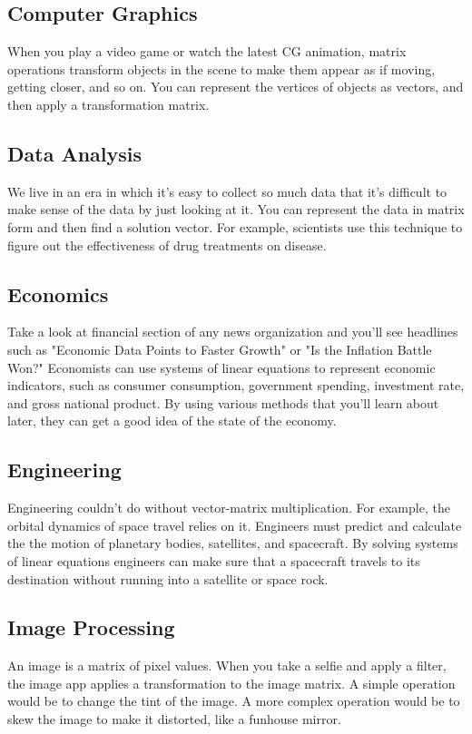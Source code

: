 \subsection{Computer Graphics}
When you play a video game or watch the latest CG animation, matrix operations transform objects in the scene to make them appear as if moving, getting closer, and so on. You can represent the vertices of objects as vectors, and then apply a transformation matrix.
\subsection{Data Analysis}
We live in an era in which it's easy to collect so much data that it's difficult to make sense of the data by just looking at it. You can represent the data in matrix form and then find a solution vector. For example, scientists use this technique to figure out the effectiveness of drug treatments on disease.
\subsection{Economics}
Take a look at financial section of any news organization and you'll see headlines such as "Economic Data Points to Faster Growth" or "Is the Inflation Battle Won?" Economists can use systems of linear equations to represent economic indicators, such as consumer consumption, government spending, investment rate, and gross national product. By using various methods that you'll learn about later, they can get a good idea of the state of the economy.
\subsection{Engineering}
Engineering couldn't do without vector-matrix multiplication. For example, the orbital dynamics of space travel relies on it. Engineers must predict and calculate the the motion of planetary bodies, satellites, and spacecraft. By solving systems of linear equations engineers can make sure that a spacecraft travels to its destination without running into a satellite or space rock.
\subsection{Image Processing}
An image is a matrix of pixel values. When you take a selfie and apply a filter, the image app applies a transformation to the image matrix. A simple operation would be to change the tint of the image. A more complex operation would be to skew the image to make it distorted, like a funhouse mirror.
